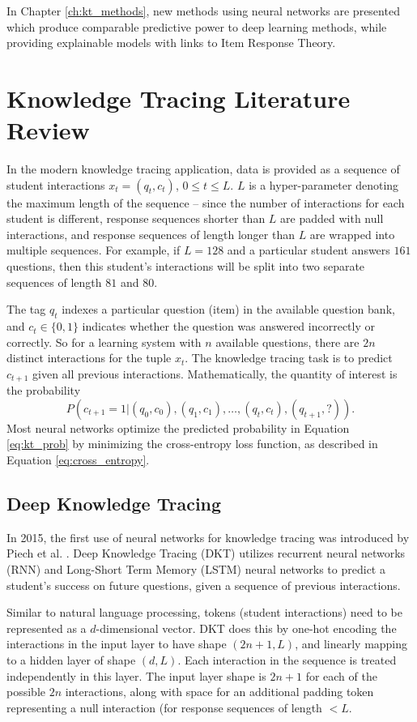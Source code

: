In Chapter \ref{ch:kt_methods}, new methods using neural networks are presented which produce comparable predictive power to deep learning methods, while providing explainable models with links to Item Response Theory.


\section{Knowledge Tracing Literature Review}\label{sec:kt_lit}
In the modern knowledge tracing application, data is provided as a sequence of student interactions $x_t = (q_t, c_t)$, $0 \leq t \leq L$. $L$ is a hyper-parameter denoting the maximum length of the sequence -- since the number of interactions for each student is different, response sequences shorter than $L$ are padded with null interactions, and response sequences of length longer than $L$ are wrapped into multiple sequences. For example, if $L=128$ and a particular student answers $161$ questions, then this student's interactions will be split into two separate sequences of length $81$ and $80$.

The tag $q_t$ indexes a particular question (item) in the available question bank, and $c_t \in\{0,1\}$ indicates whether the question was answered incorrectly or correctly. So for a learning system with $n$ available questions, there are $2n$ distinct interactions for the tuple $x_t$. The knowledge tracing task is to predict $c_{t+1}$ given all previous interactions. Mathematically, the quantity of interest is the probability 
\begin{equation}
  P(c_{t+1} = 1 | (q_0,c_0), (q_1,c_1),\ldots,(q_t, c_t), (q_{t+1}, ?)).
  \label{eq:kt_prob}
\end{equation}
Most neural networks optimize the predicted probability in Equation \ref{eq:kt_prob} by  minimizing the cross-entropy loss function, as described in Equation \ref{eq:cross_entropy}.

\subsection{Deep Knowledge Tracing}
In 2015, the first use of neural networks for knowledge tracing was introduced by Piech et al. \cite{piech2015}. Deep Knowledge Tracing (DKT) utilizes recurrent neural networks (RNN) and Long-Short Term Memory (LSTM) neural networks to predict a student's success on future questions, given a sequence of previous interactions. 

Similar to natural language processing, tokens (student interactions) need to be represented as a $d$-dimensional vector. DKT does this by one-hot encoding the interactions in the input layer to have shape $(2n+1, L)$,  and linearly mapping to a hidden layer of shape $(d, L)$. Each interaction in the sequence is treated independently in this layer. The input layer shape is $2n+1$ for each of the possible $2n$ interactions, along with space for an additional padding token representing a null interaction (for response sequences of length $< L$.


